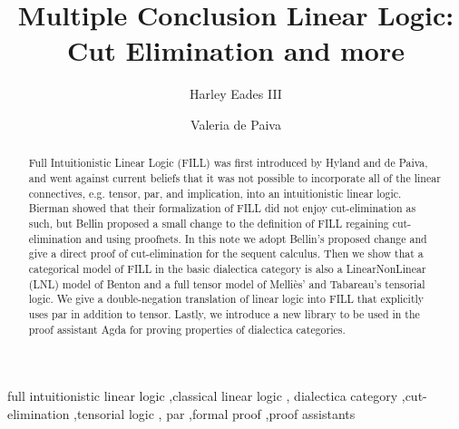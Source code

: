 \documentclass[preprint,6pt]{elsarticle}
\date{}
\begin{document}

\newcommand{\rcond}[0]{\refstepcounter{condCounter}\arabic{condCounter}}

\begin{frontmatter}
\title{Multiple Conclusion Linear Logic: \\ Cut Elimination and more}

\author[au]{Harley Eades III}

\author[nuance]{Valeria de Paiva}

\address[au]{Computer and Information Sciences, Allgood Hall, Augusta University, 120 15th Street, Augusta, GA 30912}
\address[nuance]{AI Sunnyvale Lab, Nuance Communications, 1198 E. Arques Ave, Sunnyvale, CA 94085}

\begin{abstract}
  Full Intuitionistic Linear Logic (FILL) was first introduced by
  Hyland and de Paiva, and went against current beliefs that it was
  not possible to incorporate all of the linear connectives,
  e.g. tensor, par, and implication, into an intuitionistic linear
  logic. Bierman showed that their formalization of FILL did not enjoy
  cut-elimination as such, but Bellin proposed a small change to the
  definition of FILL regaining cut-elimination and using proofnets.
  In this note we adopt Bellin's proposed change and give a direct
  proof of cut-elimination for the sequent calculus.  Then we show
  that a categorical model of FILL in the basic dialectica category is
  also a LinearNonLinear (LNL) model of Benton and a full tensor model
  of Melli\`es' and Tabareau's tensorial logic.  We give a
  double-negation translation of linear logic into FILL that
  explicitly uses par in addition to tensor.  Lastly, we introduce a
  new library to be used in the proof assistant Agda for proving
  properties of dialectica categories.
\end{abstract}

\begin{keyword}
full intuitionistic linear logic \sep classical linear logic \sep
dialectica category \sep cut-elimination \sep tensorial logic \sep
par \sep formal proof \sep proof assistants
\end{keyword}

\end{frontmatter}
\end{document}
